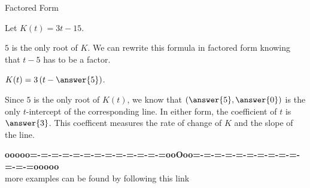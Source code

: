 \documentclass{ximera}
\begin{document}
\begin{example}  Factored Form



Let $K(t) = 3t - 15$.


$5$ is the only root of $K$.  We can rewrite this formula in factored form knowing that $t-5$ has to be a factor.


$K(t) = 3 \left(t - \answer{5} \right)$.



Since $5$ is the only root of $K(t)$, we know that $\left(\answer{5}, \answer{0}\right)$ is the only $t$-intercept of the corresponding line.  In either form, the coefficient of $t$ is $\answer{3}$.  This coefficent measures the rate of change of $K$ and the slope of the line.

\end{example}




















\begin{center}
\textbf{\textcolor{green!50!black}{ooooo=-=-=-=-=-=-=-=-=-=-=-=-=ooOoo=-=-=-=-=-=-=-=-=-=-=-=-=ooooo}} \\

more examples can be found by following this link\\ 

\end{center}
\end{document}
